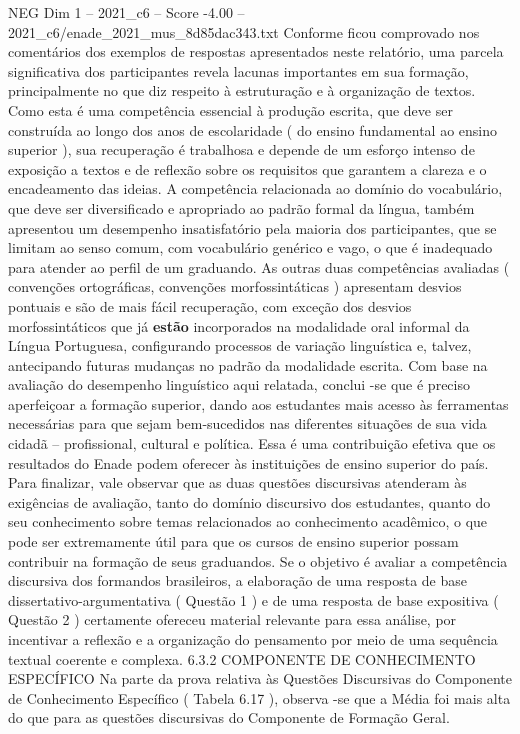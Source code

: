 \begin{textsample}{NEG Dim 1 – 2021\_c6 – Score -4.00 – 2021\_c6/enade\_2021\_mus\_8d85dac343.txt}
Conforme ficou comprovado nos comentários dos exemplos de respostas apresentados neste relatório, uma parcela significativa dos participantes revela lacunas importantes em sua formação, principalmente no que diz respeito à estruturação e à organização de textos.
Como esta é uma competência essencial à produção escrita, que deve ser construída ao longo dos anos de escolaridade ( do ensino fundamental ao ensino superior ), sua recuperação é trabalhosa e depende de um esforço intenso de exposição a textos e de reflexão sobre os requisitos que garantem a clareza e o encadeamento das ideias.
A competência relacionada ao domínio do vocabulário, que deve ser diversificado e apropriado ao padrão formal da língua, também apresentou um desempenho insatisfatório pela maioria dos participantes, que se limitam ao senso comum, com vocabulário genérico e vago, o que é inadequado para atender ao perfil de um graduando.
As outras duas competências avaliadas ( convenções ortográficas, convenções morfossintáticas ) apresentam desvios pontuais e são de mais fácil recuperação, com exceção dos desvios morfossintáticos que já \textbf{estão} incorporados na modalidade oral informal da Língua Portuguesa, configurando processos de variação linguística e, talvez, antecipando futuras mudanças no padrão da modalidade escrita.
Com base na avaliação do desempenho linguístico aqui relatada, conclui -se que é preciso aperfeiçoar a formação superior, dando aos estudantes mais acesso às ferramentas necessárias para que sejam bem-sucedidos nas diferentes situações de sua vida cidadã – profissional, cultural e política.
Essa é uma contribuição efetiva que os resultados do Enade podem oferecer às instituições de ensino superior do país.
Para finalizar, vale observar que as duas questões discursivas atenderam às exigências de avaliação, tanto do domínio discursivo dos estudantes, quanto do seu conhecimento sobre temas relacionados ao conhecimento acadêmico, o que pode ser extremamente útil para que os cursos de ensino superior possam contribuir na formação de seus graduandos.
Se o objetivo é avaliar a competência discursiva dos formandos brasileiros, a elaboração de uma resposta de base dissertativo-argumentativa ( Questão 1 ) e de uma resposta de base expositiva ( Questão 2 ) certamente ofereceu material relevante para essa análise, por incentivar a reflexão e a organização do pensamento por meio de uma sequência textual coerente e complexa. 6.3.2 COMPONENTE DE CONHECIMENTO ESPECÍFICO Na parte da prova relativa às Questões Discursivas do Componente de Conhecimento Específico ( Tabela 6.17 ), observa -se que a Média foi mais alta do que para as questões discursivas do Componente de Formação Geral.

\end{textsample}
